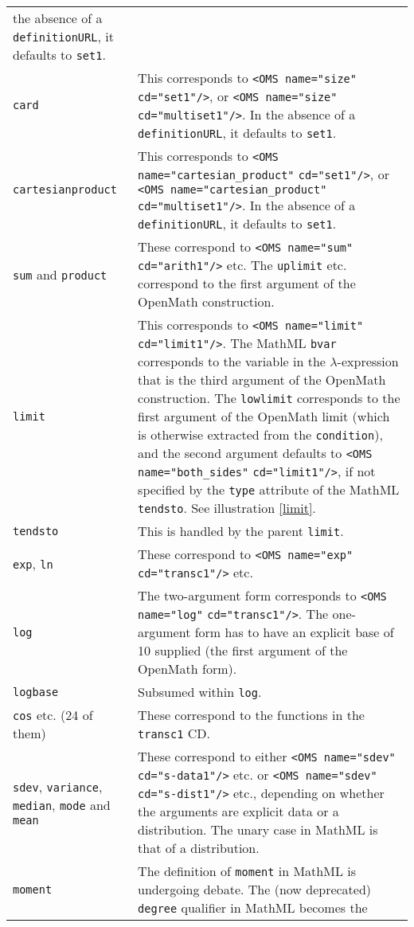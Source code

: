 \documentclass[twoside,11pt]{article}
\begin{document}
\begin{longtable}{
        >{\raggedright\let\\=\tabularnewline}p{2in}
        >{\raggedright\let\\=\tabularnewline}p{3in}}
the absence of a \verb+definitionURL+, it defaults to \verb+set1+.\\
\verb+card+&This corresponds to \verb+<OMS name="size"+ \verb+cd="set1"/>+, or
\verb+<OMS name="size"+ \verb+cd="multiset1"/>+. In 
the absence of a \verb+definitionURL+, it defaults to \verb+set1+.\\
\verb+cartesianproduct+&This corresponds to
\verb+<OMS name="cartesian_product"+ \verb+cd="set1"/>+, or
\verb+<OMS name="cartesian_product"+ \verb+cd="multiset1"/>+. In 
the absence of a \verb+definitionURL+, it defaults to \verb+set1+.\\
\verb+sum+ and \verb+product+&These correspond to
\verb+<OMS name="sum"+ \verb+cd="arith1"/>+ etc. The \verb+uplimit+
etc. correspond to the first argument of the OpenMath construction.\\ 
\verb+limit+&This corresponds to
\verb+<OMS name="limit"+ \verb+cd="limit1"/>+. The MathML \verb+bvar+
corresponds to the variable in the $\lambda$-expression that is the
third argument of the OpenMath construction. The \verb+lowlimit+
corresponds to the first argument of the OpenMath limit (which is otherwise
extracted from the \verb+condition+), and the second argument defaults
to \verb+<OMS name="both_sides"+ \verb+cd="limit1"/>+, if not specified by
the \verb+type+ attribute of the MathML \verb+tendsto+. See
illustration \ref{limit}.\\
\verb+tendsto+&This is handled by the parent \verb+limit+.\\
\verb+exp+, \verb+ln+&These correspond to
\verb+<OMS name="exp"+ \verb+cd="transc1"/>+ etc.\\
\verb+log+&The two-argument form corresponds to
\verb+<OMS name="log"+ \verb+cd="transc1"/>+. The one-argument form has to have an
explicit base of 10 supplied (the first argument of the OpenMath form).\\
\verb+logbase+&Subsumed within \verb+log+.\\
\verb+cos+ etc. (24 of them)&These correspond to the functions in the
\verb+transc1+ CD.\\
\verb+sdev+, \verb+variance+, \verb+median+, \verb+mode+ and
\verb+mean+&These correspond to either
\verb+<OMS name="sdev"+ \verb+cd="s-data1"/>+ etc. or
\verb+<OMS name="sdev"+ \verb+cd="s-dist1"/>+ etc., depending on whether the
arguments are explicit data or a distribution. The unary case in
MathML is that of a distribution.\\
\verb+moment+&The definition of \verb+moment+ in MathML is undergoing
debate. The (now deprecated) \verb+degree+ qualifier in MathML becomes the 

\end{longtable}
\end{document}
